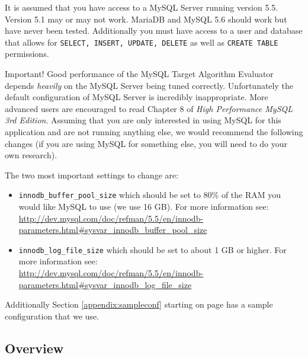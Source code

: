 \documentclass[11pt,letterpaper,oneside]{article}
\begin{document}
It is assumed that you have access to a MySQL Server running version 5.5. Version 5.1 may or may not work. MariaDB and MySQL 5.6 should work but have never been tested. Additionally you must have access to a user and database that allows for \texttt{SELECT, INSERT, UPDATE, DELETE} as well as \texttt{CREATE TABLE} permissions.

\begin{bclogo}[logo=\bcattention, couleurBarre=red, noborder=true]{Important!}
Good performance of the MySQL Target Algorithm Evaluator depends \emph{heavily} on the MySQL Server being tuned correctly. Unfortunately the default configuration of MySQL Server is incredibly inappropriate. More advanced users are encouraged to read Chapter 8 of \emph{High Performance MySQL 3rd Edition}.  Assuming that you are only interested in using MySQL for this application and are not running anything else, we would recommend the following changes (if you are using MySQL for something else, you will need to do your own research).

The two most important settings to change are:

\begin{itemize}
\item \texttt{innodb\_buffer\_pool\_size} which should be set to 80\% of the RAM you would like MySQL to use (we use 16 GB). For more information see: \\ \url{http://dev.mysql.com/doc/refman/5.5/en/innodb-parameters.html\#sysvar\_innodb\_buffer\_pool\_size}

\item \texttt{innodb\_log\_file\_size} which should be set to about 1 GB or higher.  For more information see: \\
\url{http://dev.mysql.com/doc/refman/5.5/en/innodb-parameters.html\#sysvar\_innodb\_log\_file\_size}

\end{itemize}

Additionally Section \ref{appendix:sampleconf} starting on page \pageref{appendix:sampleconf} has a sample configuration that we use.

\end{bclogo}

\subsection{Overview}
\end{document}
